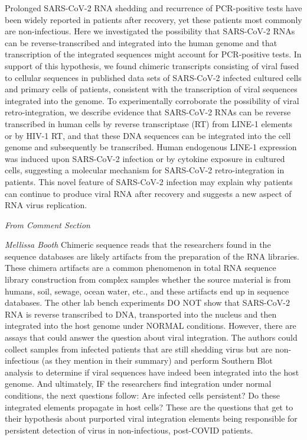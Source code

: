 \documentclass[
]{book}
\begin{document}
Prolonged SARS-CoV-2 RNA shedding and recurrence of PCR-positive tests have been widely reported in patients after recovery, yet these patients most commonly are non-infectious. Here we investigated the possibility that SARS-CoV-2 RNAs can be reverse-transcribed and integrated into the human genome and that transcription of the integrated sequences might account for PCR-positive tests. In support of this hypothesis, we found chimeric transcripts consisting of viral fused to cellular sequences in published data sets of SARS-CoV-2 infected cultured cells and primary cells of patients, consistent with the transcription of viral sequences integrated into the genome. To experimentally corroborate the possibility of viral retro-integration, we describe evidence that SARS-CoV-2 RNAs can be reverse transcribed in human cells by reverse transcriptase (RT) from LINE-1 elements or by HIV-1 RT, and that these DNA sequences can be integrated into the cell genome and subsequently be transcribed. Human endogenous LINE-1 expression was induced upon SARS-CoV-2 infection or by cytokine exposure in cultured cells, suggesting a molecular mechanism for SARS-CoV-2 retro-integration in patients. This novel feature of SARS-CoV-2 infection may explain why patients can continue to produce viral RNA after recovery and suggests a new aspect of RNA virus replication.

\emph{From Comment Section}

\emph{Mellissa Booth}
Chimeric sequence reads that the researchers found in the sequence databases are likely artifacts from the preparation of the RNA libraries. These chimera artifacts are a common phenomenon in total RNA sequence library construction from complex samples whether the source material is from humans, soil, sewage, ocean water, etc., and these artifacts end up in sequence databases. The other lab bench experiments DO NOT show that SARS-CoV-2 RNA is reverse transcribed to DNA, transported into the nucleus and then integrated into the host genome under NORMAL conditions. However, there are assays that could answer the question about viral integration. The authors could collect samples from infected patients that are still shedding virus but are non-infectious (as they mention in their summary) and perform Southern Blot analysis to determine if viral sequences have indeed been integrated into the host genome. And ultimately, IF the researchers find integration under normal conditions, the next questions follow: Are infected cells persistent? Do these integrated elements propagate in host cells? These are the questions that get to their hypothesis about purported viral integration elements being responsible for persistent detection of virus in non-infectious, post-COVID patients.
\end{document}
